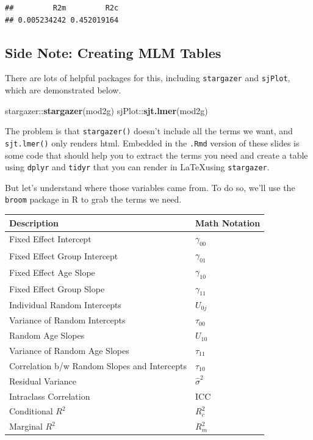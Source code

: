 \documentclass[]{article}
\newenvironment{Shaded}{\begin{snugshade}}{\end{snugshade}}
\newcommand{\KeywordTok}[1]{\textcolor[rgb]{0.13,0.29,0.53}{\textbf{{#1}}}}
\newcommand{\NormalTok}[1]{{#1}}
\begin{document}
\begin{verbatim}
##         R2m         R2c 
## 0.005234242 0.452019164
\end{verbatim}

\normalsize

\subsection{Side Note: Creating MLM
Tables}\label{side-note-creating-mlm-tables}

There are lots of helpful packages for this, including
\texttt{stargazer} and \texttt{sjPlot}, which are demonstrated below.\\
\small

\begin{Shaded}
\begin{Highlighting}[]
\NormalTok{stargazer::}\KeywordTok{stargazer}\NormalTok{(mod2g)}
\NormalTok{sjPlot::}\KeywordTok{sjt.lmer}\NormalTok{(mod2g)}
\end{Highlighting}
\end{Shaded}

\normalsize

The problem is that \texttt{stargazer()} doesn't include all the terms
we want, and \texttt{sjt.lmer()} only renders html. Embedded in the
\texttt{.Rmd} version of these slides is some code that should help you
to extract the terms you need and create a table using \texttt{dplyr}
and \texttt{tidyr} that you can render in \LaTeX using
\texttt{stargazer}.

But let's understand where those variables came from. To do so, we'll
use the \texttt{broom} package in R to grab the terms we need.

\begin{longtable}[]{@{}ll@{}}
\toprule
Description & Math Notation\tabularnewline
\midrule
\endhead
Fixed Effect Intercept & \(\gamma_{00}\)\tabularnewline
Fixed Effect Group Intercept & \(\gamma_{01}\)\tabularnewline
Fixed Effect Age Slope & \(\gamma_{10}\)\tabularnewline
Fixed Effect Group Slope & \(\gamma_{11}\)\tabularnewline
Individual Random Intercepts & \(U_{0j}\)\tabularnewline
Variance of Random Intercepts & \(\tau_{00}\)\tabularnewline
Random Age Slopes & \(U_{10}\)\tabularnewline
Variance of Random Age Slopes & \(\tau_{11}\)\tabularnewline
Correlation b/w Random Slopes and Intercepts &
\(\tau_{10}\)\tabularnewline
Residual Variance & \(\hat{\sigma}^2\)\tabularnewline
Intraclass Correlation & ICC\tabularnewline
Conditional \(R^2\) & \(R^2_c\)\tabularnewline
Marginal \(R^2\) & \(R^2_m\)\tabularnewline
\bottomrule
\end{longtable}
\end{document}
